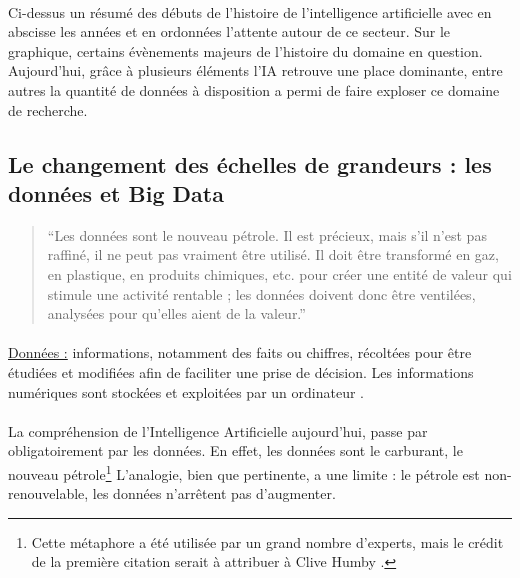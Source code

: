 \documentclass[10pt, french, a4paper]{report}
\begin{document}
\paragraph{}
Ci-dessus un résumé des débuts de l’histoire de l’intelligence artificielle avec en abscisse les années et en ordonnées l’attente autour de ce secteur. Sur le graphique, certains évènements majeurs de l’histoire du domaine en question. Aujourd'hui, grâce à plusieurs éléments l'IA retrouve une place dominante, entre autres la quantité de données à disposition a permi de faire exploser ce domaine de recherche. 

\subsection{Le changement des échelles de grandeurs : les données et Big Data}

\begin{quotation}
  ``Les données sont le nouveau pétrole. Il est précieux, mais s'il n'est pas raffiné, il ne peut pas vraiment être utilisé. Il doit être transformé en gaz, en plastique, en produits chimiques, etc. pour créer une entité de valeur qui stimule une activité rentable ; les données doivent donc être ventilées, analysées pour qu'elles aient de la valeur.''
\end{quotation}

\paragraph{}
\underline{Données :} informations, notamment des faits ou chiffres, récoltées pour être étudiées et modifiées afin de faciliter une prise de décision. Les informations numériques sont stockées et exploitées par un ordinateur \citep{cambridge_data_2020}.

\paragraph{}
La compréhension de l'Intelligence Artificielle aujourd'hui, passe par obligatoirement par les données. En effet, les données sont le carburant, le nouveau pétrole\footnote{Cette métaphore a été utilisée par un grand nombre d'experts, mais le crédit de la première citation serait à attribuer à Clive Humby \citep{haupt_who_2006}.} L'analogie, bien que pertinente, a une limite : le pétrole est non-renouvelable, les données n'arrêtent pas d'augmenter.
\end{document}
